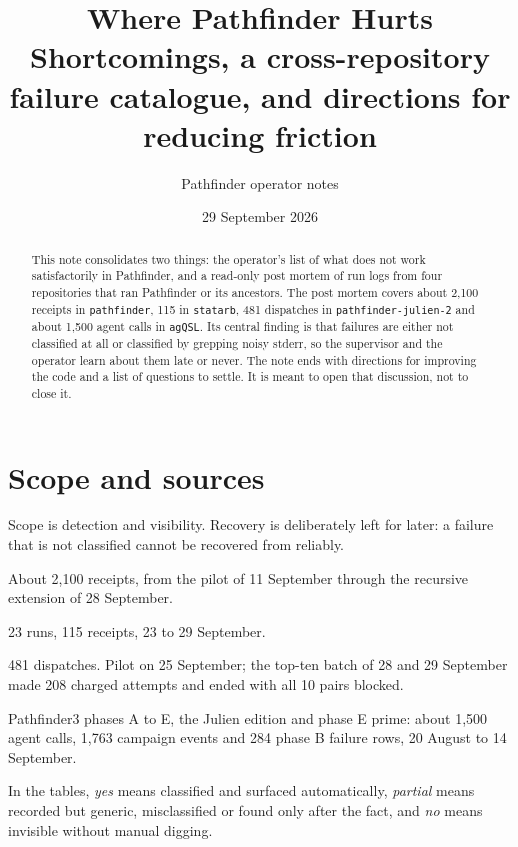 \documentclass[11pt,a4paper]{article}
\title{Where Pathfinder Hurts\\
\large Shortcomings, a cross-repository failure catalogue, and directions for reducing friction}
\author{Pathfinder operator notes}
\date{29 September 2026}
\begin{document}
\maketitle

\begin{abstract}
This note consolidates two things: the operator's list of what does not work
satisfactorily in Pathfinder, and a read-only post mortem of run logs from four
repositories that ran Pathfinder or its ancestors. The post mortem covers about
2,100 receipts in \texttt{pathfinder}, 115 in \texttt{statarb}, 481 dispatches in
\texttt{pathfinder-julien-2} and about 1,500 agent calls in \texttt{agQSL}. Its
central finding is that failures are either not classified at all or classified
by grepping noisy stderr, so the supervisor and the operator learn about them
late or never. The note ends with directions for improving the code and a list
of questions to settle. It is meant to open that discussion, not to close it.
\end{abstract}

\tableofcontents

\section{Scope and sources}

Scope is detection and visibility. Recovery is deliberately left for later: a
failure that is not classified cannot be recovered from reliably.

\begin{description}[leftmargin=2em,style=nextline]
\item[PF: \texttt{pathfinder}] About 2,100 receipts, from the pilot of 11 September
  through the recursive extension of 28 September.
\item[SA: \texttt{statarb} arxiv\_drip] 23 runs, 115 receipts, 23 to 29 September.
\item[J2: \texttt{pathfinder-julien-2}] 481 dispatches. Pilot on 25 September; the
  top-ten batch of 28 and 29 September made 208 charged attempts and ended with all
  10 pairs blocked.
\item[AQ: \texttt{agQSL}] Pathfinder3 phases A to E, the Julien edition and phase
  E prime: about 1,500 agent calls, 1,763 campaign events and 284 phase B failure
  rows, 20 August to 14 September.
\end{description}

In the tables, \emph{yes} means classified and surfaced automatically,
\emph{partial} means recorded but generic, misclassified or found only after
the fact, and \emph{no} means invisible without manual digging.
\end{document}
